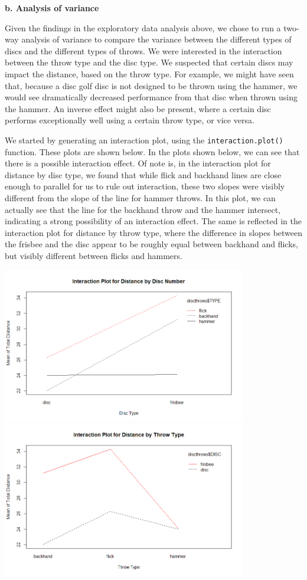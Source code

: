 \documentclass[letter,12pt]{article}
\begin{document}
	\begin{center}
		\textbf{b. Analysis of variance}
	\end{center}
	\justify
	Given the findings in the exploratory data analysis above, we chose to run a two-way analysis of variance to compare the variance between the different types of discs and the different types of throws. We were interested in the interaction between the throw type and the disc type. We suspected that certain discs may impact the distance, based on the throw type. For example, we might have seen that, because a disc golf disc is not designed to be thrown using the hammer, we would see dramatically decreased performance from that disc when thrown using the hammer. An inverse effect might also be present, where a certain disc performs exceptionally well using a certain throw type, or vice versa.\par
  We started by generating an interaction plot, using the \verb!interaction.plot()! function. These plots are shown below. In the plots shown below, we can see that there is a possible interaction effect. Of note is, in the interaction plot for distance by disc type, we found that while flick and backhand lines are close enough to parallel for us to rule out interaction, these two slopes were visibly different from the slope of the line for hammer throws. In this plot, we can actually see that the line for the backhand throw and the hammer intersect, indicating a strong possibility of an interaction effect. The same is reflected in the interaction plot for distance by throw type, where the difference in slopes between the frisbee and the disc appear to be roughly equal between backhand and flicks, but visibly different between flicks and hammers.\par
  \begin{center}
    \includegraphics[width=0.8\textwidth]{intdistdisc.png}
    \includegraphics[width=0.8\textwidth]{interactiondistthrow.png}
  \end{center}
\end{document}
